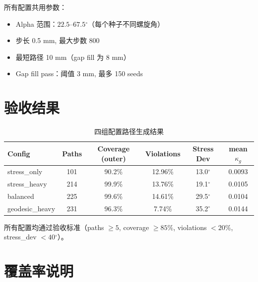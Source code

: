 \documentclass[11pt,a4paper]{article}
\begin{document}
所有配置共用参数：
\begin{itemize}[nosep]
\item Alpha 范围：$22.5$--$67.5$$^\circ$（每个种子不同螺旋角）
\item 步长 0.5 mm, 最大步数 800
\item 最短路径 10 mm（gap fill 为 8 mm）
\item Gap fill pass：阈值 3 mm, 最多 150 seeds
\end{itemize}

\section{验收结果}

\begin{table}[H]
\centering
\begin{tabularx}{\textwidth}{l c c c c c}
\toprule
\textbf{Config} & \textbf{Paths} & \textbf{Coverage (outer)} & \textbf{Violations} & \textbf{Stress Dev} & \textbf{mean $\kappa_g$} \\
\midrule
stress\_only & 101 & 90.2\% & 12.96\% & 13.0$^\circ$ & 0.0093 \\
stress\_heavy & 214 & 99.9\% & 13.76\% & 19.1$^\circ$ & 0.0105 \\
balanced & 225 & 99.6\% & 14.61\% & 29.5$^\circ$ & 0.0104 \\
geodesic\_heavy & 231 & 96.3\% & 7.74\% & 35.2$^\circ$ & 0.0144 \\
\bottomrule
\end{tabularx}
\caption{四组配置路径生成结果}
\end{table}

所有配置均通过验收标准（paths $\geq 5$, coverage $\geq 85\%$, violations $< 20\%$, stress\_dev $< 40$$^\circ$）。

\noindent{}

\section{覆盖率说明}

\noindent{}
\end{document}
